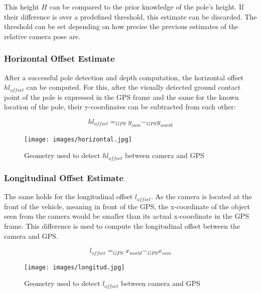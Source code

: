 This height $H$ can be compared to the prior knowledge of the pole's height. If their difference is over a predefined threshold, this estimate can be discarded. The threshold can be set depending on how precise the previous estimates of the relative camera pose are.



\subsubsection{Horizontal Offset Estimate}
After a successful pole detection and depth computation, the horizontal offset $hl_{offset}$ can be computed. For this, after the visually detected ground contact point of the pole is expressed in the GPS frame and the same for the known location of the pole, their y-coordinates can be subtracted from each other:

\begin{equation}
hl_{offset} = _{GPS} y_{cam} - _{GPS} y_{world}
\label{eq:x_pos}
\end{equation}

\begin{figure}[h]
   \centering
   \texttt{[image: images/horizontal.jpg]}
   \caption{Geometry used to detect $hl_{offset}$ between camera and GPS}
   \label{pics:x_pos}
\end{figure}



\subsubsection{Longitudinal Offset Estimate}
The same holds for the longitudinal offset $l_{offset}$. As the camera is located at the front of the vehicle, meaning in front of the GPS, the x-coordinate of the object seen from the camera would be smaller than its actual x-coordinate in the GPS frame. This difference is used to compute the longitudinal offset between the camera and GPS.

\begin{equation}
l_{offset} = _{GPS} x_{world} - _{GPS} x_{cam}
\label{eq:z_pos}
\end{equation}

\begin{figure}[h!]
   \centering
   \texttt{[image: images/longitud.jpg]}
   \caption{Geometry used to detect $l_{offset}$ between camera and GPS}
   \label{pics:z_pos}
\end{figure}
\newpage





